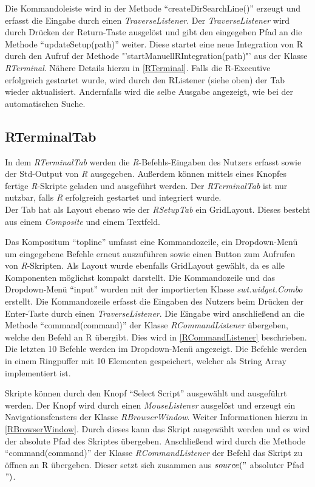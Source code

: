 \documentclass[a4paper, 12pt]{report} %
\begin{document}
Die Kommandoleiste wird in der Methode "`createDirSearchLine()"' erzeugt und erfasst die Eingabe durch einen \textit{TraverseListener}. Der \textit{TraverseListener} wird durch Drücken der Return-Taste ausgelöst und gibt den eingegeben Pfad an die Methode "`updateSetup(path)"' weiter. Diese startet eine neue Integration von R durch den Aufruf der Methode "'startManuellRIntegration(path)"' aus der Klasse \textit{RTerminal}. Nähere Details hierzu in \ref{RTerminal}. Falls die R-Executive erfolgreich gestartet wurde, wird durch den RListener (siehe oben) der Tab wieder aktualisiert. Andernfalls wird die selbe Ausgabe angezeigt, wie bei der automatischen Suche.

\subsection{RTerminalTab}

In dem \textit{RTerminalTab} werden die \textit{R}-Befehls-Eingaben des Nutzers erfasst sowie der Std-Output von \textit{R} ausgegeben. Außerdem können mittels eines Knopfes fertige \textit{R}-Skripte geladen und ausgeführt werden. Der \textit{RTerminalTab} ist nur nutzbar, falls \textit{R} erfolgreich gestartet und integriert wurde.\\

Der Tab hat als Layout ebenso wie der \textit{RSetupTab} ein GridLayout.
Dieses besteht aus einem \textit{Composite} und einem Textfeld.

Das Kompositum "`topline"' umfasst eine Kommandozeile, ein Dropdown-Menü um eingegebene Befehle erneut auszuführen sowie einen Button zum Aufrufen von \textit{R}-Skripten. Als Layout wurde ebenfalls GridLayout gewählt, da es alle Komponenten möglichst kompakt darstellt.
Die Kommandozeile und das Dropdown-Menü "`input"' wurden mit der importierten Klasse \textit{swt.widget.Combo} erstellt. Die Kommandozeile erfasst die Eingaben des Nutzers beim Drücken der Enter-Taste durch einen \textit{TraverseListener}. Die Eingabe wird anschließend an die Methode "`command(command)"' der Klasse  \textit{RCommandListener} übergeben, welche den Befehl an R übergibt. Dies wird in \ref{RCommandListener} beschrieben.
Die letzten 10 Befehle werden im Dropdown-Menü angezeigt. Die Befehle werden in einem Ringpuffer mit 10 Elementen gespeichert, welcher als String Array implementiert ist.

Skripte können durch den Knopf "`Select Script"' ausgewählt und ausgeführt werden. Der Knopf wird durch einen \textit{MouseListener} ausgelöst und erzeugt ein Navigationsfensters der Klasse \textit{RBrowserWindow}. Weiter Informationen hierzu in \ref{RBrowserWindow}. Durch dieses kann das Skript ausgewählt werden und es wird der absolute Pfad des Skriptes übergeben. Anschließend wird durch die Methode "`command(command)"' der Klasse  \textit{RCommandListener} der Befehl das Skript zu öffnen an R übergeben. Dieser setzt sich zusammen aus $source("$  absoluter Pfad $")$. \\
\end{document}

